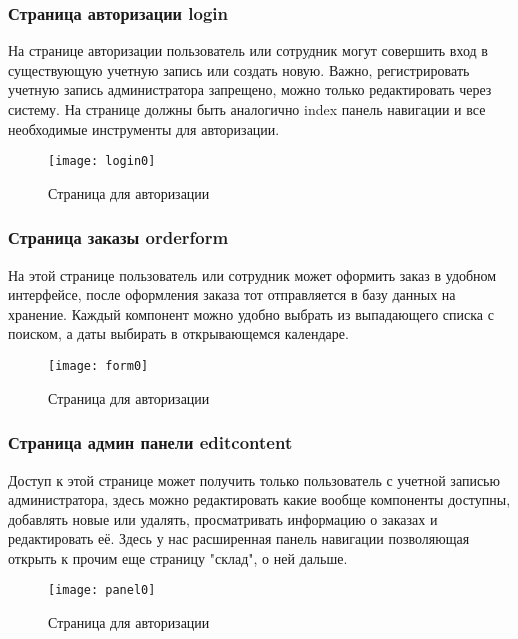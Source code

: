 \newpage

\subsubsection{Страница авторизации login}

На странице авторизации пользователь или сотрудник могут совершить вход в существующую учетную запись или создать новую. Важно, регистрировать учетную запись администратора запрещено, можно только редактировать через систему. На странице должны быть аналогично index панель навигации и все необходимые инструменты для авторизации.

\begin{figure}[ht]
	\texttt{[image: login0]}
	\caption{Страница для авторизации}
	\label{indext:login0}
\end{figure}

\newpage

\subsubsection{Страница заказы orderform}

На этой странице пользователь или сотрудник может оформить заказ в удобном интерфейсе, после оформления заказа тот отправляется в базу данных на хранение. Каждый компонент можно удобно выбрать из выпадающего списка с поиском, а даты выбирать в открывающемся календаре.

\begin{figure}[ht]
	\texttt{[image: form0]}
	\caption{Страница для авторизации}
	\label{indext:form0}
\end{figure}

\subsubsection{Страница админ панели editcontent}

Доступ к этой странице может получить только пользователь с учетной записью администратора, здесь можно редактировать какие вообще компоненты доступны, добавлять новые или удалять, просматривать информацию о заказах и редактировать её. Здесь у нас расширенная панель навигации позволяющая открыть к прочим еще страницу "склад", о ней дальше.

\begin{figure}[ht]
	\texttt{[image: panel0]}
	\caption{Страница для авторизации}
	\label{indext:panel0}
\end{figure}

